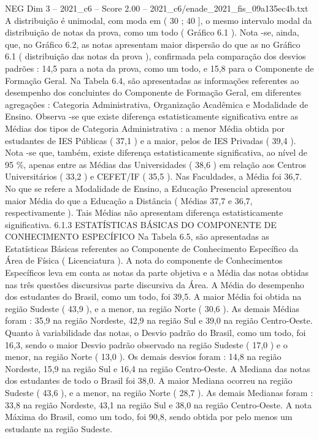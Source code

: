 \begin{textsample}{NEG Dim 3 – 2021\_c6 – Score 2.00 – 2021\_c6/enade\_2021\_fis\_09a135ec4b.txt}
A distribuição é unimodal, com moda em ( 30 ; 40 ], o mesmo intervalo modal da distribuição de notas da prova, como um todo ( Gráfico 6.1 ).
Nota -se, ainda, que, no Gráfico 6.2, as notas apresentam maior dispersão do que as no Gráfico 6.1 ( distribuição das notas da prova ), confirmada pela comparação dos desvios padrões : 14,5 para a nota da prova, como um todo, e 15,8 para o Componente de Formação Geral.
Na Tabela 6.4, são apresentadas as informações referentes ao desempenho dos concluintes do Componente de Formação Geral, em diferentes agregações : Categoria Administrativa, Organização Acadêmica e Modalidade de Ensino.
Observa -se que existe diferença estatisticamente significativa entre as Médias dos tipos de Categoria Administrativa : a menor Média obtida por estudantes de IES Públicas ( 37,1 ) e a maior, pelos de IES Privadas ( 39,4 ).
Nota -se que, também, existe diferença estatisticamente significativa, ao nível de 95 \%, apenas entre as Médias das Universidades ( 38,6 ) em relação aos Centros Universitários ( 33,2 ) e CEFET/IF ( 35,5 ).
Nas Faculdades, a Média foi 36,7.
No que se refere a Modalidade de Ensino, a Educação Presencial apresentou maior Média do que a Educação a Distância ( Médias 37,7 e 36,7, respectivamente ).
Tais Médias não apresentam diferença estatisticamente significativa. 6.1.3 ESTATÍSTICAS BÁSICAS DO COMPONENTE DE CONHECIMENTO ESPECÍFICO Na Tabela 6.5, são apresentadas as Estatísticas Básicas referentes ao Componente de Conhecimento Específico da Área de Física ( Licenciatura ).
A nota do componente de Conhecimentos Específicos leva em conta as notas da parte objetiva e a Média das notas obtidas nas três questões discursivas parte discursiva da Área.
A Média do desempenho dos estudantes do Brasil, como um todo, foi 39,5.
A maior Média foi obtida na região Sudeste ( 43,9 ), e a menor, na região Norte ( 30,6 ).
As demais Médias foram : 35,9 na região Nordeste, 42,9 na região Sul e 39,0 na região Centro-Oeste.
Quanto à variabilidade das notas, o Desvio padrão do Brasil, como um todo, foi 16,3, sendo o maior Desvio padrão observado na região Sudeste ( 17,0 ) e o menor, na região Norte ( 13,0 ).
Os demais desvios foram : 14,8 na região Nordeste, 15,9 na região Sul e 16,4 na região Centro-Oeste.
A Mediana das notas dos estudantes de todo o Brasil foi 38,0.
A maior Mediana ocorreu na região Sudeste ( 43,6 ), e a menor, na região Norte ( 28,7 ).
As demais Medianas foram : 33,8 na região Nordeste, 43,1 na região Sul e 38,0 na região Centro-Oeste.
A nota Máxima do Brasil, como um todo, foi 90,8, sendo obtida por pelo menos um estudante na região Sudeste.

\end{textsample}
